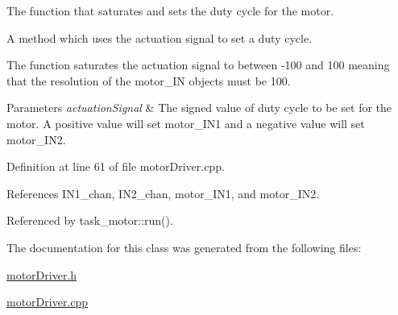 The function that saturates and sets the duty cycle for the motor. 

A method which uses the actuation signal to set a duty cycle.

The function saturates the actuation signal to between -\/100 and 100 meaning that the resolution of the motor\+\_\+\+IN objects must be 100. 
\begin{DoxyParams}{Parameters}
{\em actuation\+Signal} & The signed value of duty cycle to be set for the motor. A positive value will set motor\+\_\+\+I\+N1 and a negative value will set motor\+\_\+\+I\+N2. \\
\hline
\end{DoxyParams}


Definition at line 61 of file motor\+Driver.\+cpp.



References I\+N1\+\_\+chan, I\+N2\+\_\+chan, motor\+\_\+\+I\+N1, and motor\+\_\+\+I\+N2.



Referenced by task\+\_\+motor\+::run().



The documentation for this class was generated from the following files\+:\begin{DoxyCompactItemize}
\item 
\hyperlink{motorDriver_8h}{motor\+Driver.\+h}\item 
\hyperlink{motorDriver_8cpp}{motor\+Driver.\+cpp}\end{DoxyCompactItemize}
